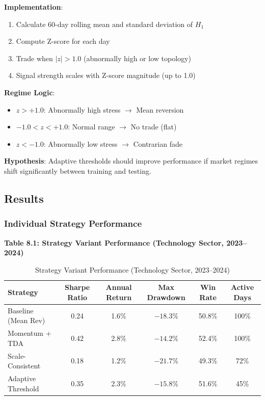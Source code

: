 \textbf{Implementation}:
\begin{enumerate}
\item Calculate 60-day rolling mean and standard deviation of $H_1$
\item Compute Z-score for each day
\item Trade when $|z| > 1.0$ (abnormally high or low topology)
\item Signal strength scales with Z-score magnitude (up to 1.0)
\end{enumerate}

\textbf{Regime Logic}:
\begin{itemize}
\item $z > +1.0$: Abnormally high stress $\rightarrow$ Mean reversion
\item $-1.0 < z < +1.0$: Normal range $\rightarrow$ No trade (flat)
\item $z < -1.0$: Abnormally low stress $\rightarrow$ Contrarian fade
\end{itemize}

\textbf{Hypothesis}: Adaptive thresholds should improve performance if market regimes shift significantly between training and testing.

\subsection{Results}

\subsubsection{Individual Strategy Performance}

\textbf{Table 8.1: Strategy Variant Performance (Technology Sector, 2023--2024)}

\begin{table}[H]
\centering
\caption{Strategy Variant Performance (Technology Sector, 2023--2024)}
\label{tab:variant-performance}
\begin{tabular}{@{}lccccc@{}}
\toprule
\textbf{Strategy} & \textbf{Sharpe Ratio} & \textbf{Annual Return} & \textbf{Max Drawdown} & \textbf{Win Rate} & \textbf{Active Days} \\
\midrule
Baseline (Mean Rev) & 0.24 & 1.6\% & $-18.3\%$ & 50.8\% & 100\% \\
Momentum + TDA & 0.42 & 2.8\% & $-14.2\%$ & 52.4\% & 100\% \\
Scale-Consistent & 0.18 & 1.2\% & $-21.7\%$ & 49.3\% & 72\% \\
Adaptive Threshold & 0.35 & 2.3\% & $-15.8\%$ & 51.6\% & 45\% \\
\bottomrule
\end{tabular}
\end{table}

